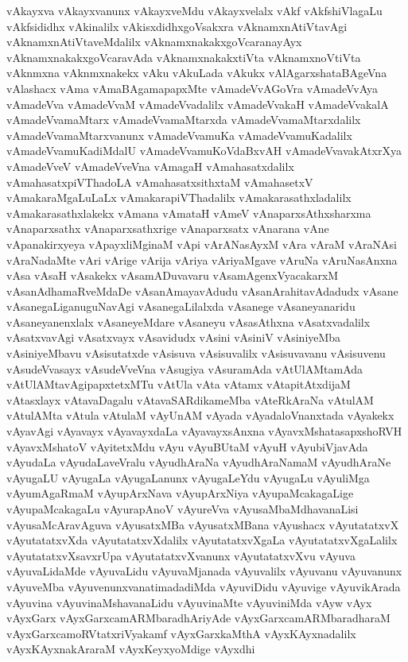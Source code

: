 {vAkayxva
vAkayxvanunx
vAkayxveMdu
vAkayxvelalx
vAkf
vAkfshiVlagaLu
vAkfsididhx
vAkinalilx
vAkisxdidhxgoVsakxra
vAknamxnAtiVtavAgi
vAknamxnAtiVtaveMdalilx
vAknamxnakakxgoVcaranayAyx
vAknamxnakakxgoVcaravAda
vAknamxnakakxtiVta
vAknamxnoVtiVta
vAknmxna
vAknmxnakekx
vAku
vAkuLada
vAkukx
vAlAgarxshataBAgeVna
vAlashacx
vAma
vAmaBAgamapapxMte
vAmadeVvAGoVra
vAmadeVvAya
vAmadeVva
vAmadeVvaM
vAmadeVvadalilx
vAmadeVvakaH
vAmadeVvakalA
vAmadeVvamaMtarx
vAmadeVvamaMtarxda
vAmadeVvamaMtarxdalilx
vAmadeVvamaMtarxvanunx
vAmadeVvamuKa
vAmadeVvamuKadalilx
vAmadeVvamuKadiMdalU
vAmadeVvamuKoVdaBxvAH
vAmadeVvavakAtxrXya
vAmadeVveV
vAmadeVveVna
vAmagaH
vAmahasatxdalilx
vAmahasatxpiVThadoLA
vAmahasatxsithxtaM
vAmahasetxV
vAmakaraMgaLuLaLx
vAmakarapiVThadalilx
vAmakarasathxladalilx
vAmakarasathxlakekx
vAmana
vAmataH
vAmeV
vAnaparxsAthxsharxma
vAnaparxsathx
vAnaparxsathxrige
vAnaparxsatx
vAnarana
vAne
vApanakirxyeya
vApayxliMginaM
vApi
vArANasAyxM
vAra
vAraM
vAraNAsi
vAraNadaMte
vAri
vArige
vArija
vAriya
vAriyaMgave
vAruNa
vAruNasAnxna
vAsa
vAsaH
vAsakekx
vAsamADuvavaru
vAsamAgenxVyacakarxM
vAsanAdhamaRveMdaDe
vAsanAmayavAdudu
vAsanArahitavAdadudx
vAsane
vAsanegaLiganuguNavAgi
vAsanegaLilalxda
vAsanege
vAsaneyanaridu
vAsaneyanenxlalx
vAsaneyeMdare
vAsaneyu
vAsasAthxna
vAsatxvadalilx
vAsatxvavAgi
vAsatxvayx
vAsavidudx
vAsini
vAsiniV
vAsiniyeMba
vAsiniyeMbavu
vAsisutatxde
vAsisuva
vAsisuvalilx
vAsisuvavanu
vAsisuvenu
vAsudeVvasayx
vAsudeVveVna
vAsugiya
vAsuramAda
vAtUlAMtamAda
vAtUlAMtavAgipapxtetxMTu
vAtUla
vAta
vAtamx
vAtapitAtxdijaM
vAtasxlayx
vAtavaDagalu
vAtavaSARdikameMba
vAteRkAraNa
vAtulAM
vAtulAMta
vAtula
vAtulaM
vAyUnAM
vAyada
vAyadaloVnanxtada
vAyakekx
vAyavAgi
vAyavayx
vAyavayxdaLa
vAyavayxsAnxna
vAyavxMshatasapxshoRVH
vAyavxMshatoV
vAyitetxMdu
vAyu
vAyuBUtaM
vAyuH
vAyubiVjavAda
vAyudaLa
vAyudaLaveVralu
vAyudhAraNa
vAyudhAraNamaM
vAyudhAraNe
vAyugaLU
vAyugaLa
vAyugaLanunx
vAyugaLeYdu
vAyugaLu
vAyuliMga
vAyumAgaRmaM
vAyupArxNava
vAyupArxNiya
vAyupaMcakagaLige
vAyupaMcakagaLu
vAyurapAnoV
vAyureVva
vAyusaMbaMdhavanaLisi
vAyusaMcAravAguva
vAyusatxMBa
vAyusatxMBana
vAyushacx
vAyutatatxvX
vAyutatatxvXda
vAyutatatxvXdalilx
vAyutatatxvXgaLa
vAyutatatxvXgaLalilx
vAyutatatxvXsavxrUpa
vAyutatatxvXvanunx
vAyutatatxvXvu
vAyuva
vAyuvaLidaMde
vAyuvaLidu
vAyuvaMjanada
vAyuvalilx
vAyuvanu
vAyuvanunx
vAyuveMba
vAyuvenunxvanatimadadiMda
vAyuviDidu
vAyuvige
vAyuvikArada
vAyuvina
vAyuvinaMshavanaLidu
vAyuvinaMte
vAyuviniMda
vAyw
vAyx
vAyxGarx
vAyxGarxcamARMbaradhAriyAde
vAyxGarxcamARMbaradharaM
vAyxGarxcamoRVtatxriVyakamf
vAyxGarxkaMthA
vAyxKAyxnadalilx
vAyxKAyxnakAraraM
vAyxKeyxyoMdige
vAyxdhi
}
